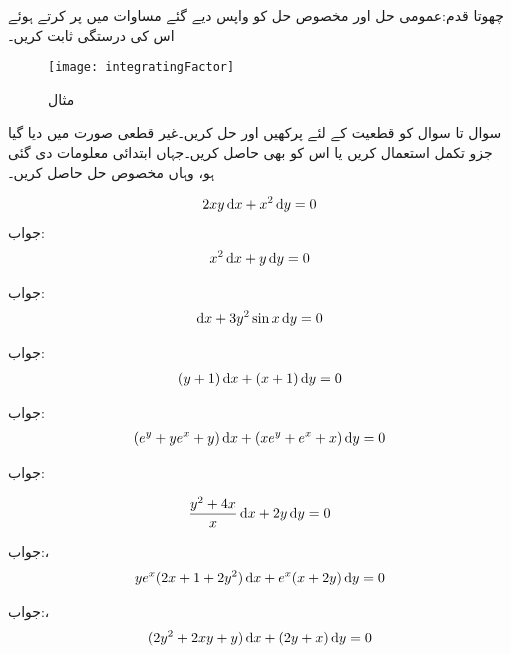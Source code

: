 چھوتا قدم:عمومی حل اور مخصوص حل کو واپس دیے گئے مساوات میں پر کرتے ہوئے اس کی درستگی ثابت کریں۔
\begin{figure}
\centering
\texttt{[image: integratingFactor]}
\caption{مثال }
\label{شکل_مثال_سادہ_اول_جزو_تکمل_حصول}
\end{figure}

سوال  تا سوال  کو قطعیت کے لئے پرکھیں اور حل کریں۔غیر قطعی صورت میں دیا گیا جزو تکمل استعمال کریں یا اس کو بھی حاصل کریں۔جہاں ابتدائی معلومات دی گئی ہو، وہاں مخصوص حل حاصل کریں۔

\begin{align*}
2xy \dif x+x^2\dif y=0
\end{align*}
جواب:
\begin{align*}
x^2\dif x+y\dif y=0
\end{align*}

جواب:
\begin{align*}
[\sin x+(x+y^3)\cos x]\dif x+3y^2\sin x \dif y=0
\end{align*}

جواب:
\begin{align*}
(y+1)\dif x+(x+1)\dif y=0
\end{align*}

جواب:
\begin{align*}
(e^y+ye^x+y)\dif x+(xe^y+e^x+x)\dif y=0
\end{align*}

جواب:

\begin{align*}
\frac{y^2+4x}{x}\dif x+2y\dif y=0
\end{align*}

جواب:، 
\begin{align*}
ye^x(2x+1+2y^2)\dif x+e^x(x+2y)\dif y=0
\end{align*}

جواب:، 
\begin{align*}
(2y^2+2xy+y)\dif x+(2y+x)\dif y=0
\end{align*}

